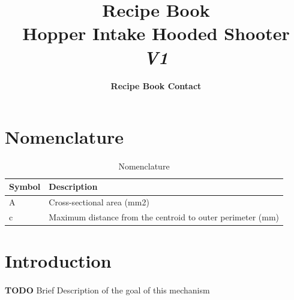 \documentclass[12pt, a4paper]{article}
\title{
  \huge\textbf{Recipe Book} \\
  \vspace{5em}
  \large\textbf{Hopper Intake Hooded Shooter}\\
  \vspace{0.5em}
  \normalsize\textit{V1}
}
\author{
    \textbf{Recipe Book Contact} \\
    \email{firstroboticsteam@curtin.edu.au}
}
\date{}
\newcommand{\TODO}[1]{{\color{red}\textbf{TODO} #1}}
\begin{document}
\maketitle
\pagebreak

\tableofcontents
\paragraph{}
\newpage
\listoffigures
\paragraph{}
\listoftables
\listofmyequations
\paragraph{}
\pagebreak


\section{Nomenclature}\label{sec:nomen}
\paragraph{}
\begin{table}[h]
    \centering
    \begin{tabular}{l|l}
      Symbol & Description~ \\ \hline \hline
      A & Cross-sectional area (mm2) \\ \hline
      c & Maximum distance from the centroid to outer perimeter (mm)      \\ \hline                          
    \end{tabular}
    \caption{Nomenclature}
    \label{tab:nome}
  \end{table}

\newpage
\section{Introduction} \label{sec:intro}

\paragraph{}
\TODO {Brief Description of the goal of this mechanism}
\end{document}
